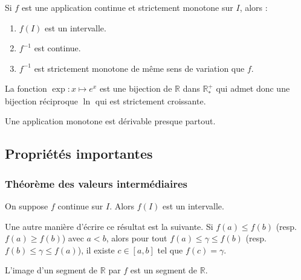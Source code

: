   \begin{theorem}[Bijection]
    Si $f$ est une application continue et strictement monotone sur $I$, alors :
    \begin{enumerate}[label=(\roman*)]
      \item $f(I)$ est un intervalle.
      \item $f^{-1}$ est continue.
      \item $f^{-1}$ est strictement monotone de même sens de variation que $f$.
    \end{enumerate}
  \end{theorem}

  \begin{example}
    La fonction $\exp : x \mapsto e^x$ est une bijection de $\mathbb{R}$ dans $\mathbb{R}^{+}_{*}$ qui admet donc une bijection réciproque $\ln$ qui est strictement croissante.
  \end{example}


  \begin{theorem}[Lebesgue]
    Une application monotone est dérivable presque partout.
  \end{theorem}

  \subsection{Propriétés importantes}

  \subsubsection{Théorème des valeurs intermédiaires}


  \begin{theorem}
    On suppose $f$ continue sur $I$. Alors $f(I)$ est un intervalle.
  \end{theorem}

  \begin{remark}
    Une autre manière d'écrire ce résultat est la suivante. Si $f(a) \leq f(b)$ (resp. $f(a) \geq f(b)$) avec $a < b$, alors pour tout $f(a) \leq \gamma \leq f(b)$ (resp. $f(b) \leq \gamma \leq f(a)$), il existe $c \in [a,b]$ tel que $f(c) = \gamma$.
  \end{remark}

  \begin{corollary}
    L'image d'un segment de $\mathbb{R}$ par $f$ est un segment de $\mathbb{R}$.
  \end{corollary}


